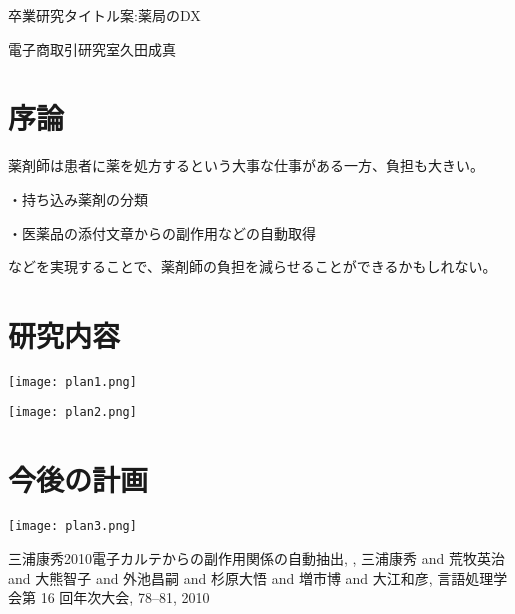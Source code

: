 \documentclass[report]{jlreq}
\begin{document}
\begin{multicols}{2}

{\LARGE
    卒業研究タイトル案:薬局のDX

\vspace{3mm}
}

\vspace{-2mm}
\begin{flushright}
電子商取引研究室\hspace{10pt}久田成真
\end{flushright}
\vspace{3mm}
\end{multicols}


\begin{multicols}{2}
\section{序論}
薬剤師は患者に薬を処方するという大事な仕事がある一方、負担も大きい。

・持ち込み薬剤の分類

・医薬品の添付文章からの副作用などの自動取得

などを実現することで、薬剤師の負担を減らせることができるかもしれない。
\section{研究内容}

\texttt{[image: plan1.png]}

\texttt{[image: plan2.png]}

\section{今後の計画}

\texttt{[image: plan3.png]}


\begin{thebibliography}{1}
    \item{三浦康秀2010電子カルテからの副作用関係の自動抽出,
,
{三浦康秀 and 荒牧英治 and 大熊智子 and 外池昌嗣 and 杉原大悟 and 増市博 and 大江和彦},
{言語処理学会第 16 回年次大会},
{78--81},
{2010}
}
\end{thebibliography}

\end{multicols}
\end{document}
